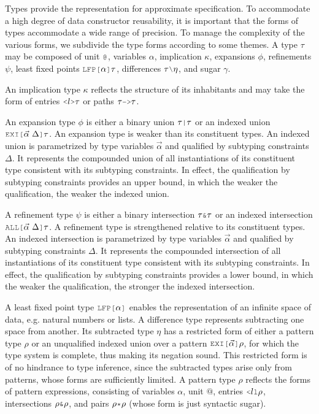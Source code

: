 \documentclass[acmsmall]{acmart}
\theoremstyle{definition}
\begin{document}
\noindent
Types provide the representation for approximate specification.
To accommodate a high degree of data constructor reusability,
it is important that the forms of types accommodate a wide range of precision.
To manage the complexity of the various forms, we subdivide the type forms
according to some themes.
A type $\tau$ may be composed of unit $\J{@}$, variables $\alpha$, 
implication $\kappa$, expansions $\phi$, refinements $\psi$,
least fixed points $\J{LFP[}\alpha \J{]} \tau$,
differences $\tau \typdiff \eta$, and sugar $\gamma$.

An implication type $\kappa$ reflects the structure of 
its inhabitants and may take the form of  
entries $\J{<}l\J{>}\tau$ or paths $\tau \J{->} \tau$.

An expansion type $\phi$ is either a binary union $\tau \J{|} \tau$ or 
an indexed union $\J{EXI[}\vec{\alpha}\ \Delta\J{]}\tau$.
An expansion type is weaker than its constituent types. 
An indexed union is parametrized by type variables $\vec{\alpha}$ 
and qualified by subtyping constraints $\Delta$.
It represents the compounded union of all instantiations of its constituent type 
consistent with its subtyping constraints.
In effect, the qualification by subtyping constraints provides an upper bound, in which
the weaker the qualification, the weaker the indexed union.

A refinement type $\psi$ is either a binary intersection $\tau \J{\&} \tau$ or 
an indexed intersection $\J{ALL[} \vec{\alpha}\ \Delta \J{]}\tau$.
A refinement type is strengthened relative to its constituent types. 
An indexed intersection is parametrized by type variables $\vec{\alpha}$ 
and qualified by subtyping constraints $\Delta$.
It represents the compounded intersection of all instantiations of its constituent type 
consistent with its subtyping constraints.
In effect, the qualification by subtyping constraints provides a lower bound, in which
the weaker the qualification, the stronger the indexed intersection.

A least fixed point type $\J{LFP[}\alpha \J{]}$ 
enables the representation of an infinite space of data,
e.g. natural numbers or lists. 
A difference type represents subtracting one space from another.
Its subtracted type $\eta$ has a restricted form of either
a pattern type $\rho$ or an unqualified indexed union 
over a pattern $\J{EXI[}\vec{\alpha} \J{]} \rho$, for which the type system
is complete, thus making its negation sound.  
This restricted form is of no hindrance to type inference, since the 
subtracted types arise only from patterns, whose forms are sufficiently
limited.
A pattern type $\rho$ reflects the forms of pattern expressions, consisting of 
variables $\alpha$, unit $@$, entries $\J{<} l \J{l} \rho$, intersections $\rho \J{\&} \rho$,
and pairs $\rho \J{*} \rho$ (whose form is just syntactic sugar).
\end{document}
